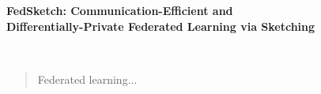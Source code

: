 \documentclass[article]{article}
\begin{document}
\begin{center}

{\bf{\LARGE{FedSketch: Communication-Efficient and \\
\vspace*{.2in}
Differentially-Private Federated Learning via Sketching}}}
\vspace*{.2in}

{{
}}


\vspace*{.2in}



{\large{
\begin{tabular}{c}
\end{tabular}
}}

\begin{tabular}{c}
\end{tabular}

\vspace*{.2in}


\date{\today}

\end{center}

\begin{abstract}
Federated learning... 
\end{abstract}




\newpage


\newpage
\appendix

\end{document}
